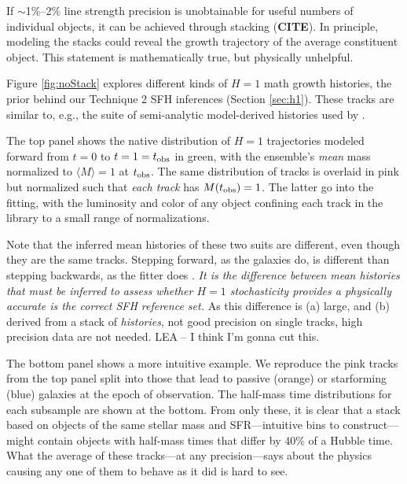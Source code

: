 \documentclass[a4paper,fleqn,usenatbib]{mnras}
\newcommand{\bfr}{\bf\color{red}}
\newcommand{\bfb}{\color{myblue}}
\newcommand{\tobs}{t_{\rm obs}}
\newcommand{\CITE}{{\bfr CITE}}
\begin{document}
If $\sim$1\%--2\% line strength precision is unobtainable for useful numbers of individual objects, 
it can be achieved through stacking (\CITE). In principle, modeling the stacks could reveal the growth 
trajectory of the average constituent object. This statement is mathematically true, but physically unhelpful.


Figure \ref{fig:noStack} explores different kinds of $H=1$ math growth histories, the prior behind
our Technique 2 SFH inferences (Section \ref{sec:h1}). These tracks are similar to, e.g., the suite of 
semi-analytic model-derived histories used by \citet{Pacifici12}. 

The top panel shows the native distribution of $H=1$ trajectories modeled forward 
from $t=0$ to $t=1=\tobs$ in green, with the ensemble's {\it mean} mass normalized to 
$\langle M\rangle=1$ at $\tobs$. The same distribution of tracks is overlaid in pink but normalized such 
that {\it each track} has $M(\tobs)=1$. The latter go into the fitting, with the luminosity and color of any
object confining each track in the library to a small range of normalizations. 

Note that the inferred mean histories of these two suits are different, even though they are the same 
tracks. Stepping forward, as the galaxies do, is different than stepping backwards, as the fitter does 
\citep[see also][]{Behroozi13a, Torrey17}. {\it It is the difference between mean histories that must
be inferred to assess whether $H=1$ stochasticity provides a physically accurate is the correct SFH 
reference set.} As this difference is (a) large, and (b) derived from a stack of {\it histories}, not good 
precision on single tracks, high precision data are not needed. {\bfb LEA -- I think I'm gonna cut this.}

The bottom panel shows a more intuitive example. We reproduce the pink tracks from the top panel split 
into those that lead to passive (orange) or starforming (blue) galaxies at the epoch of observation. 
The half-mass time distributions for each subsample are shown at the bottom. From only these, it is 
clear that a stack based on objects of the same stellar mass and SFR---intuitive bins to construct---might 
contain objects with half-mass times that differ by 40\% of a Hubble time. What the average of these 
tracks---at any precision---says about the physics causing any one of them to behave as it did is hard to see.
\end{document}
